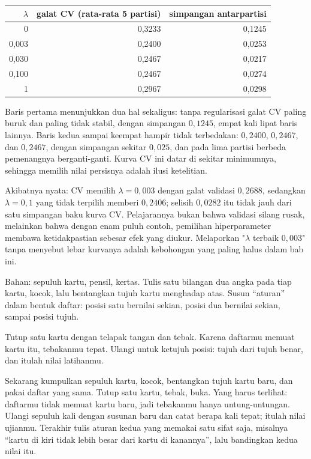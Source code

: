 \begin{center}
\small
\begin{tabular}{rrr}
\hline
$\lambda$ & galat CV (rata-rata 5 partisi) & simpangan antarpartisi \\
\hline
0     & 0,3233 & 0,1245 \\
0,003 & 0,2400 & 0,0253 \\
0,030 & 0,2467 & 0,0217 \\
0,100 & 0,2467 & 0,0274 \\
1     & 0,2967 & 0,0298 \\
\hline
\end{tabular}
\end{center}

Baris pertama menunjukkan dua hal sekaligus: tanpa regularisasi galat CV paling buruk
dan paling tidak stabil, dengan simpangan $0{,}1245$, empat kali lipat baris lainnya.
Baris kedua sampai keempat hampir tidak terbedakan: $0{,}2400$, $0{,}2467$, dan
$0{,}2467$, dengan simpangan sekitar $0{,}025$, dan pada lima partisi berbeda pemenangnya
berganti-ganti. Kurva CV ini datar di sekitar minimumnya, sehingga memilih nilai
persisnya adalah ilusi ketelitian.

Akibatnya nyata: CV memilih $\lambda=0{,}003$ dengan galat validasi $0{,}2688$,
sedangkan $\lambda=0{,}1$ yang tidak terpilih memberi $0{,}2406$; selisih $0{,}0282$ itu
tidak jauh dari satu simpangan baku kurva CV. Pelajarannya bukan bahwa validasi silang
rusak, melainkan bahwa dengan enam puluh contoh, pemilihan hiperparameter membawa
ketidakpastian sebesar efek yang diukur. Melaporkan "$\lambda$ terbaik $0{,}003$" tanpa
menyebut lebar kurvanya adalah kebohongan yang paling halus dalam bab
ini.

\begin{tangan}
Bahan: sepuluh kartu, pensil, kertas. Tulis satu bilangan dua angka pada tiap kartu,
kocok, lalu bentangkan tujuh kartu menghadap atas. Susun ``aturan'' dalam bentuk daftar:
posisi satu bernilai sekian, posisi dua bernilai sekian, sampai posisi tujuh.

Tutup satu kartu dengan telapak tangan dan tebak. Karena daftarmu memuat kartu itu,
tebakanmu tepat. Ulangi untuk ketujuh posisi: tujuh dari tujuh benar, dan itulah nilai
latihanmu.

Sekarang kumpulkan sepuluh kartu, kocok, bentangkan tujuh kartu baru, dan pakai daftar
yang sama. Tutup satu kartu, tebak, buka. Yang harus terlihat: daftarmu tidak memuat
kartu baru, jadi tebakanmu hanya untung-untungan. Ulangi sepuluh kali dengan susunan
baru dan catat berapa kali tepat; itulah nilai ujianmu. Terakhir tulis aturan kedua yang
memakai satu sifat saja, misalnya ``kartu di kiri tidak lebih besar dari kartu di
kanannya'', lalu bandingkan kedua nilai itu.
\end{tangan}

